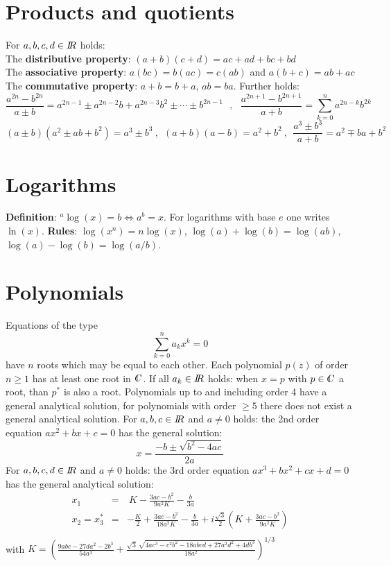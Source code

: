 \documentclass[twoside]{report}
\begin{document}
\section{Products and quotients}
For $a,b,c,d\in I\hspace{-1mm}R$ holds:\\
The {\bf distributive property}: $(a+b)(c+d)=ac+ad+bc+bd$\\
The {\bf associative property}: $a(bc)=b(ac)=c(ab)$ and $a(b+c)=ab+ac$\\
The {\bf commutative property}: $a+b=b+a$, $ab=ba$.
\npar
Further holds:
\[
\frac{a^{2n}-b^{2n}}{a\pm b}=a^{2n-1}\pm a^{2n-2}b+a^{2n-3}b^2\pm\cdots\pm b^{2n-1}~~~,~~~
\frac{a^{2n+1}-b^{2n+1}}{a+b}=\sum_{k=0}^n a^{2n-k}b^{2k}
\]
\[
(a\pm b)(a^2\pm ab+b^2)=a^3\pm b^3~,~~(a+b)(a-b)=a^2+b^2~,~~
\frac{a^3\pm b^3}{a+b}=a^2\mp ba+b^2
\]

\section{Logarithms}
{\bf Definition}: $^a\log(x)=b\Leftrightarrow a^b=x$. For logarithms with
base $e$ one writes $\ln(x)$.
\npar
{\bf Rules}: $\log(x^n)=n\log(x)$, $\log(a)+\log(b)=\log(ab)$, $\log(a)-\log(b)=\log(a/b)$.

\section{Polynomials}
Equations of the type
\[
\sum_{k=0}^n a_kx^k=0
\]
have $n$ roots which may be equal to each other. Each polynomial $p(z)$ of order
$n\geq1$ has at least one root in $\CC$. If all $a_k\in I\hspace{-1mm}R$ holds: when
$x=p$ with $p\in\CC$ a root, than $p^*$ is also a root. Polynomials up to and
including order 4 have a general analytical solution, for polynomials with
order $\geq5$ there does not exist a general analytical solution.
\npar
For $a,b,c\in I\hspace{-1mm}R$ and $a\neq0$ holds:
the 2nd order equation $ax^2+bx+c=0$ has the general solution:
\[
x=\frac{-b\pm\sqrt{b^2-4ac}}{2a}
\]
For $a,b,c,d\in I\hspace{-1mm}R$ and $a\neq0$ holds:
the 3rd order equation $ax^3+bx^2+cx+d=0$ has the general analytical solution:
\begin{eqnarray*}
x_1&=&~K-\frac{3ac-b^2}{9a^2K}-\frac{b}{3a}\\
x_2=x_3^*&=&-\frac{K}{2}+\frac{3ac-b^2}{18a^2K}-\frac{b}{3a}+i\frac{\sqrt{3}}{2}\left(K+\frac{3ac-b^2}{9a^2K}\right)\\
\end{eqnarray*}
with $\displaystyle K=\left(\frac{9abc-27da^2-2b^3}{54a^3}+
\frac{\sqrt{3}\,\sqrt{4ac^3-c^2b^2-18abcd+27a^2d^2+4db^3}}{18a^2}\right)^{1/3}$
\end{document}
